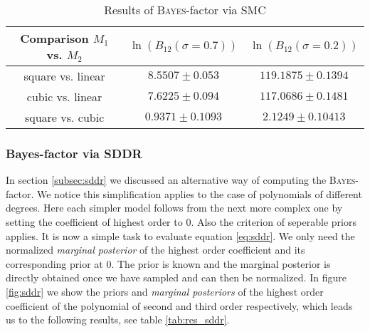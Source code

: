 \documentclass[%
 reprint,
 amsmath,amssymb,
 aps,
]{revtex4-1}
\begin{document}
\begin{table}[htbp]
	{\renewcommand{\arraystretch}{1.3}
		\begin{tabular}{|c|c|c|}
			\hline
			Comparison $M_1$ vs. $M_2$ & $\ln(B_{12}(\sigma=0.7))$& $\ln(B_{12}(\sigma=0.2))$  \\
			\hline
			square vs. linear& $8.5507\pm0.053$&$119.1875\pm0.1394$\\
			cubic vs. linear & $7.6225\pm0.094$&$117.0686\pm0.1481$\\
			square vs. cubic&$0.9371\pm0.1093$ &$2.1249\pm0.10413$\\
			\hline
	\end{tabular}}
	\caption{Results of \textsc{Bayes}-factor via SMC}
	\label{tab:res_smc}
\end{table}


\subsubsection{\textbf{Bayes-factor via SDDR}}
\noindent In section \eqref{subsec:sddr} we discussed an alternative way of computing the \textsc{Bayes}-factor. We notice this simplification applies to the case of polynomials of different degrees. Here each simpler model follows from the next more complex one by setting the coefficient of highest order to $0$. Also the criterion of seperable priors applies. It is now a simple task to evaluate equation \eqref{eq:sddr}. We only need the normalized \emph{marginal posterior} of the highest order coefficient and its corresponding prior at $0$. The prior is known and the marginal posterior is directly obtained once we have sampled and can then be normalized. In figure \eqref{fig:sddr} we show the priors and \emph{marginal posteriors} of the highest order coefficient of the polynomial of second and third order respectively, which leads us to the following results, see table \eqref{tab:res_sddr}.
\end{document}
